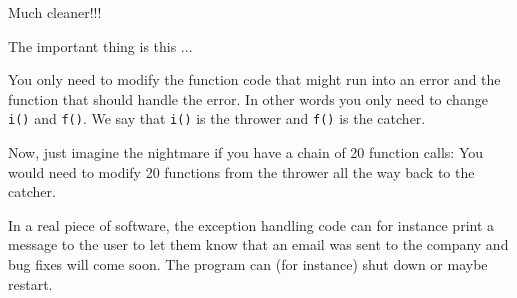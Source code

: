 Much cleaner!!!

The important thing is this ...

You only need to modify the function code that might run into an error
and the function that should handle the error. In other words you only
need to change \texttt{i()} and \texttt{f()}. We say that \texttt{i()} is the
thrower and \texttt{f()} is the catcher.

Now, just imagine the nightmare if you have a chain of 20 function
calls: You would need to modify 20 functions from the thrower all the
way back to the catcher.

In a real piece of software, the exception handling code can for
instance print a message to the user to let them know that an email was
sent to the company and bug fixes will come soon. The program can (for
instance) shut down or maybe restart.

